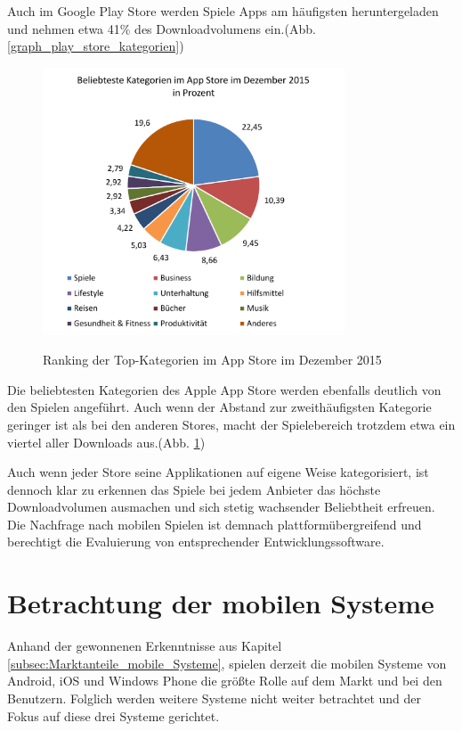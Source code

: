 Auch im Google Play Store werden Spiele Apps am häufigsten heruntergeladen und nehmen etwa 41\% des Downloadvolumens ein.(Abb. \ref{graph_play_store_kategorien})

\begin{figure}[htbp]
	\centering
	\includegraphics[width=0.8\textwidth]{Bilder/Top_Kategorien_App_Store}
	\caption{Ranking der Top-Kategorien im App Store im Dezember 2015}\label{graph_app_store_kategorien}\citep{app_store_categories}
\end{figure}

Die beliebtesten Kategorien des Apple App Store werden ebenfalls deutlich von den Spielen angeführt. Auch wenn der Abstand zur zweithäufigsten Kategorie geringer ist als bei den anderen Stores, macht der Spielebereich trotzdem etwa ein viertel aller Downloads aus.(Abb. \ref{graph_app_store_kategorien})
\bigskip

Auch wenn jeder Store seine Applikationen auf eigene Weise kategorisiert, ist dennoch klar zu erkennen das Spiele bei jedem Anbieter das höchste Downloadvolumen ausmachen und sich stetig wachsender Beliebtheit erfreuen. Die Nachfrage nach mobilen Spielen ist demnach plattformübergreifend und berechtigt die Evaluierung von entsprechender Entwicklungssoftware.

\section{Betrachtung der mobilen Systeme}
Anhand der gewonnenen Erkenntnisse aus Kapitel \ref{subsec:Marktanteile_mobile_Systeme}, spielen derzeit die mobilen Systeme von Android, iOS und Windows Phone die größte Rolle auf dem Markt und bei den Benutzern. Folglich werden weitere Systeme nicht weiter betrachtet und der Fokus auf diese drei Systeme gerichtet.

